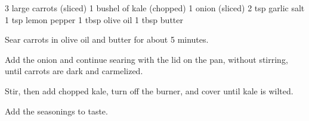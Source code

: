 \dishtype{\side}
\dishother{\vegetarian}
\begin{ingreds}
    3 large carrots (sliced)
    1 bushel of kale (chopped)
    1 onion (sliced)
    2 tsp garlic salt
    1 tsp lemon pepper
    1 tbsp olive oil
    1 tbsp butter    
\end{ingreds}
\begin{method}
    Sear carrots in olive oil and butter for about 5 minutes.\par
    Add the onion and continue searing with the lid on the pan, without stirring, until carrots are dark and carmelized.\par
    Stir, then add chopped kale, turn off the burner, and cover until kale is wilted.\par
    Add the seasonings to taste.
\end{method}